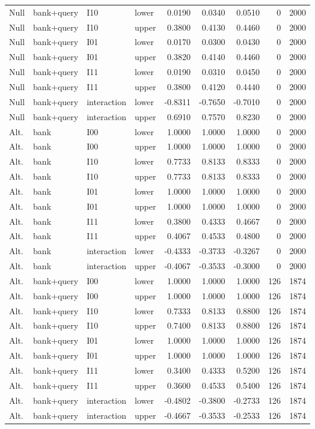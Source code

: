 {\begin{longtable}{llllrrrrr}
Null & bank+query & I10 & lower & 0.0190 & 0.0340 & 0.0510 & 0 & 2000\\
Null & bank+query & I10 & upper & 0.3800 & 0.4130 & 0.4460 & 0 & 2000\\
Null & bank+query & I01 & lower & 0.0170 & 0.0300 & 0.0430 & 0 & 2000\\
Null & bank+query & I01 & upper & 0.3820 & 0.4140 & 0.4460 & 0 & 2000\\
Null & bank+query & I11 & lower & 0.0190 & 0.0310 & 0.0450 & 0 & 2000\\
Null & bank+query & I11 & upper & 0.3800 & 0.4120 & 0.4440 & 0 & 2000\\
Null & bank+query & interaction & lower & -0.8311 & -0.7650 & -0.7010 & 0 & 2000\\
Null & bank+query & interaction & upper & 0.6910 & 0.7570 & 0.8230 & 0 & 2000\\
Alt. & bank & I00 & lower & 1.0000 & 1.0000 & 1.0000 & 0 & 2000\\
Alt. & bank & I00 & upper & 1.0000 & 1.0000 & 1.0000 & 0 & 2000\\
Alt. & bank & I10 & lower & 0.7733 & 0.8133 & 0.8333 & 0 & 2000\\
Alt. & bank & I10 & upper & 0.7733 & 0.8133 & 0.8333 & 0 & 2000\\
Alt. & bank & I01 & lower & 1.0000 & 1.0000 & 1.0000 & 0 & 2000\\
Alt. & bank & I01 & upper & 1.0000 & 1.0000 & 1.0000 & 0 & 2000\\
Alt. & bank & I11 & lower & 0.3800 & 0.4333 & 0.4667 & 0 & 2000\\
Alt. & bank & I11 & upper & 0.4067 & 0.4533 & 0.4800 & 0 & 2000\\
Alt. & bank & interaction & lower & -0.4333 & -0.3733 & -0.3267 & 0 & 2000\\
Alt. & bank & interaction & upper & -0.4067 & -0.3533 & -0.3000 & 0 & 2000\\
Alt. & bank+query & I00 & lower & 1.0000 & 1.0000 & 1.0000 & 126 & 1874\\
Alt. & bank+query & I00 & upper & 1.0000 & 1.0000 & 1.0000 & 126 & 1874\\
Alt. & bank+query & I10 & lower & 0.7333 & 0.8133 & 0.8800 & 126 & 1874\\
Alt. & bank+query & I10 & upper & 0.7400 & 0.8133 & 0.8800 & 126 & 1874\\
Alt. & bank+query & I01 & lower & 1.0000 & 1.0000 & 1.0000 & 126 & 1874\\
Alt. & bank+query & I01 & upper & 1.0000 & 1.0000 & 1.0000 & 126 & 1874\\
Alt. & bank+query & I11 & lower & 0.3400 & 0.4333 & 0.5200 & 126 & 1874\\
Alt. & bank+query & I11 & upper & 0.3600 & 0.4533 & 0.5400 & 126 & 1874\\
Alt. & bank+query & interaction & lower & -0.4802 & -0.3800 & -0.2733 & 126 & 1874\\
Alt. & bank+query & interaction & upper & -0.4667 & -0.3533 & -0.2533 & 126 & 1874\\
\bottomrule
\end{longtable}
}
